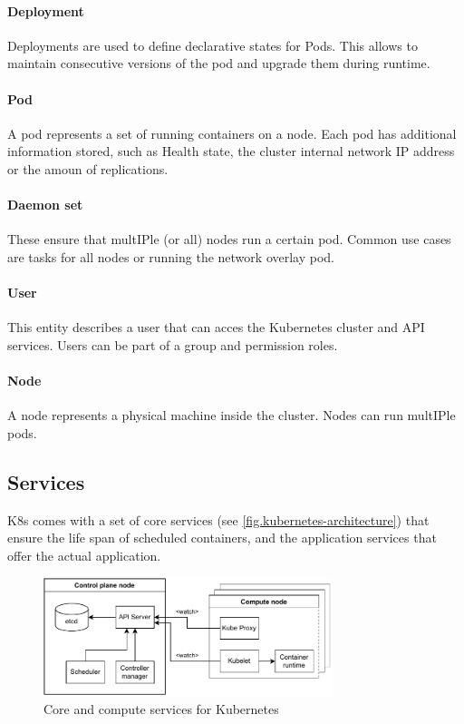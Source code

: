 \paragraph{Deployment} Deployments are used to define declarative states for Pods. This allows to maintain consecutive versions of the pod and upgrade them during runtime.
\paragraph{Pod} A pod represents a set of running containers on a node. Each pod has additional information stored, such as Health state, the cluster internal network \ac{IP} address or the amoun of replications.
\paragraph{Daemon set} These ensure that mult\ac{IP}le (or all) nodes run a certain pod\cite{Kubernetes.20220831}. Common use cases are tasks for all nodes or running the network overlay pod.
\paragraph{User} This entity describes a user that  can acces the Kubernetes cluster and API services. Users can be part of a group and permission roles.
\paragraph{Node} A node represents a physical machine inside the cluster. Nodes can run mult\ac{IP}le pods.

\subsection{Services}
\ac{K8s} comes with a set of core services (see \autoref{fig.kubernetes-architecture}) that ensure the life span of scheduled containers, and the application services that offer the actual application.
\begin{figure}[h]
	\centering
	\includegraphics[width=0.75\textwidth]{Figures/kubernetes-architecture.pdf}
	\caption{Core and compute services for Kubernetes}
	\label{fig.kubernetes-architecture}
\end{figure}

